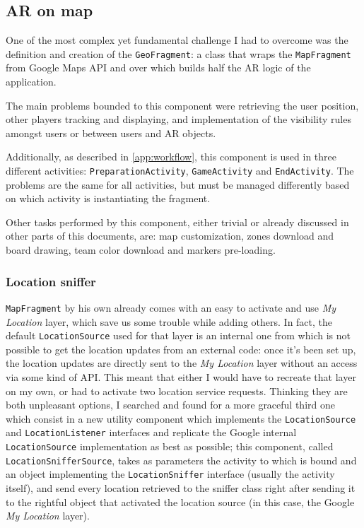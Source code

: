 		\subsection{AR on map}\label{focus:map}
		
			One of the most complex yet fundamental challenge I had to overcome was the definition and creation of the \lstinline|GeoFragment|: a class that wraps the \lstinline|MapFragment| from Google Maps API and over which builds half the AR logic of the application.
			
			The main problems bounded to this component were retrieving the user position, other players tracking and displaying, and implementation of the visibility rules amongst users or between users and AR objects.
			
			Additionally, as described in \autoref{app:workflow}, this component is used in three different activities: \lstinline|PreparationActivity|, \lstinline|GameActivity| and \lstinline|EndActivity|.
			The problems are the same for all activities, but must be managed differently based on which activity is instantiating the fragment.
			
			Other tasks performed by this component, either trivial or already discussed in other parts of this documents, are: map customization, zones download and board drawing, team color download and markers pre-loading.
			
			\subsubsection{Location sniffer}
			
			\lstinline|MapFragment| by his own already comes with an easy to activate and use \emph{My Location} layer, which save us some trouble while adding others.
			In fact, the default \lstinline|LocationSource| used for that layer is an internal one from which is not possible to get the location updates from an external code: once it's been set up, the location updates are directly sent to the \emph{My Location} layer without an access via some kind of API.
			This meant that either I would have to recreate that layer on my own, or had to activate two location service requests. Thinking they are both unpleasant options, I searched and found for a more graceful third one which consist in a new utility component which implements the \lstinline|LocationSource| and \lstinline|LocationListener| interfaces and replicate the Google internal \lstinline|LocationSource| implementation as best as possible; this component, called \lstinline|LocationSnifferSource|, takes as parameters the activity to which is bound and an object implementing the \lstinline|LocationSniffer| interface (usually the activity itself), and send every location retrieved to the sniffer class right after sending it to the rightful object that activated the location source (in this case, the Google \emph{My Location} layer).
			
